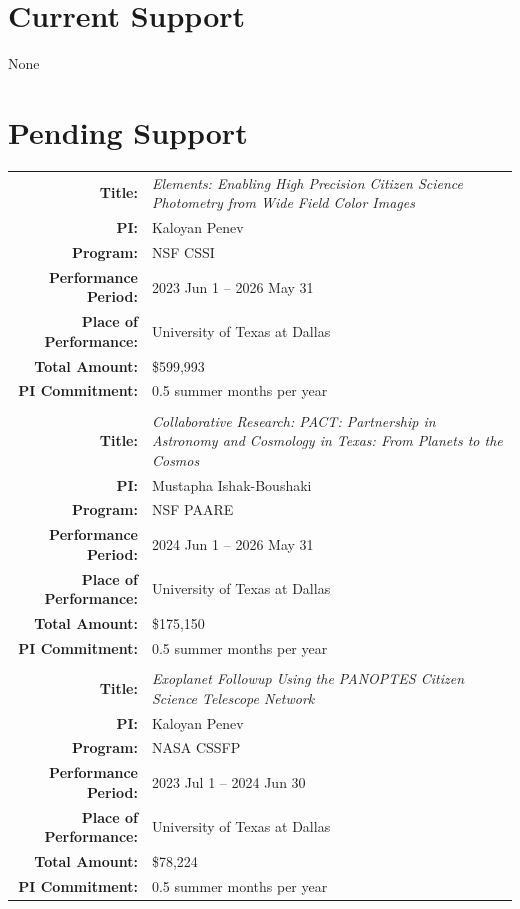 \section*{}


\hlinesep
\section*{\Large Current Support}

None
\vspace{5mm}

\hlinesep
\section*{\Large Pending Support}

\begin{tabularx}{1.0\textwidth}{rX}
    \textbf{Title:} & {\em Elements: Enabling High Precision Citizen Science Photometry from Wide Field Color Images}\\
    \textbf{PI:} & Kaloyan Penev\\
    \textbf{Program:} & NSF CSSI\\
    \textbf{Performance Period:} & 2023 Jun 1 -- 2026 May 31\\
    \textbf{Place of Performance:} & University of Texas at Dallas\\
    \textbf{Total Amount:} & \$599,993 \\
    \textbf{PI Commitment:} & 0.5 summer months per year\\
    \\
    \textbf{Title:} & {\em Collaborative Research: PACT: Partnership in Astronomy and Cosmology in Texas: From Planets to the Cosmos}\\
    \textbf{PI:} & Mustapha Ishak-Boushaki\\
    \textbf{Program:} & NSF PAARE\\
    \textbf{Performance Period:} & 2024 Jun 1 -- 2026 May 31\\
    \textbf{Place of Performance:} & University of Texas at Dallas\\
    \textbf{Total Amount:} & \$175,150 \\
    \textbf{PI Commitment:} & 0.5 summer months per year\\
    \\
    \textbf{Title:} & {\em Exoplanet Followup Using the PANOPTES Citizen Science Telescope Network}\\
    \textbf{PI:} & Kaloyan Penev\\
    \textbf{Program:} & NASA CSSFP\\
    \textbf{Performance Period:} & 2023 Jul 1 -- 2024 Jun 30\\
    \textbf{Place of Performance:} & University of Texas at Dallas\\
    \textbf{Total Amount:} & \$78,224 \\
    \textbf{PI Commitment:} & 0.5 summer months per year\\
\end{tabularx}

